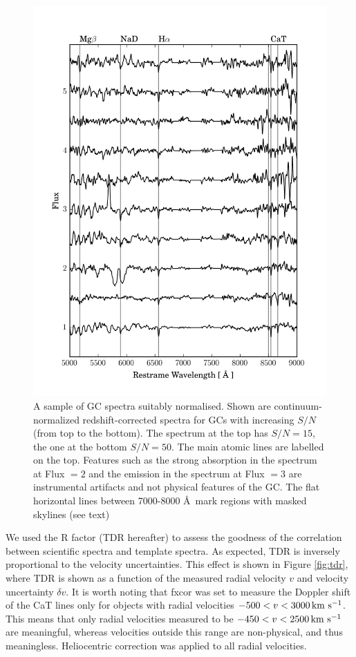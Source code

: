 \documentclass[useAMS,usenatbib]{mn2e}
\newcommand{\kms}{\mbox{\,km~s$^{-1}$}}
\begin{document}
\begin{figure}
\centering
\includegraphics[width=\columnwidth]{figures/vstack_spectra.png} 
\caption{A sample of GC spectra suitably normalised. Shown are 
continuum-normalized redshift-corrected spectra for GCs with increasing $S/N$ 
(from top to the bottom). The spectrum at the top has $S/N = 15$, the one at 
the bottom $S/N = 50$. The main atomic lines are labelled on the top. Features 
such as the strong absorption in the spectrum at Flux $= 2$ and the emission in 
the spectrum at Flux $=3$ are instrumental artifacts and not physical features 
of the GC. The flat horizontal lines between 7000-8000 \AA\ mark regions with 
masked skylines (see text)}
\label{fig:spectra}
\end{figure}

We used the \citet{Tonry79} R factor (TDR hereafter) to assess the goodness of 
the correlation between scientific spectra and template spectra. As expected, 
TDR is inversely proportional to the velocity uncertainties. This effect is 
shown in Figure \ref{fig:tdr}, where TDR is shown as a function of the measured 
radial velocity $v$ and velocity uncertainty $\delta v$. 
It is worth noting that fxcor was set to measure the Doppler shift of the CaT 
lines only for objects with radial velocities $-500 < v < 3000 \kms$. This 
means that only radial velocities measured to be $-450 < v < 2500 \kms$ are 
meaningful, whereas velocities outside this range are non-physical, and thus 
meaningless. Heliocentric correction was applied to all radial velocities. 
\end{document}
